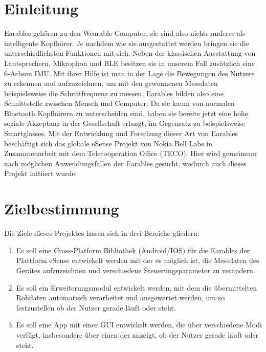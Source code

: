 \documentclass[a4paper,12pt]{article}
\title{\projektName}
\date{\today}
\begin{document}
 \setcounter{page}{2}
 \tableofcontents          %
 \clearpage

\section{Einleitung}
\Gls{Earables} gehören zu den \Gls{Wearable Computer}, sie sind also nichts anderes als intelligente Kopfhörer. Je nachdem wie sie ausgestattet werden bringen sie die unterschiedlichsten Funktionen mit sich. Neben der klassischen Ausstattung von Lautsprechern, Mikrophon und \gls{BLE} besitzen sie in unserem Fall zusätzlich eine \Gls{6-Achsen IMU}. Mit ihrer Hilfe ist man in der Lage die Bewegungen des Nutzers zu erkennen und aufzuzeichnen, um mit den gewonnenen Messdaten  beispielsweise die Schrittfrequenz zu messen.  \Gls{Earables} bilden also eine Schnittstelle zwischen Mensch und Computer. Da sie kaum von normalen Bluetooth Kopfhörern zu unterscheiden sind, haben sie bereits jetzt eine hohe soziale Akzeptanz in der Gesellschaft erlangt, im Gegensatz zu beispielsweise Smartglasses. Mit der Entwicklung und Forschung dieser Art von \Gls{Earables} beschäftigt sich das globale eSense Projekt von Nokia Bell Labs in Zusammenarbeit mit dem Telecooperation Office (TECO). Hier wird gemeinsam nach möglichen Anwendungsfällen der \Gls{Earables} gesucht, wodurch auch dieses Projekt initiiert wurde.
\section{Zielbestimmung}
Die Ziele dieses Projektes lassen sich in drei Bereiche gliedern:
\begin{enumerate}

  \item Es soll eine \Gls{Cross-Platform Bibliothek} (Android/IOS) für die \Gls{Earables} der Plattform eSense entwickelt werden mit der es möglich ist, die Messdaten des Gerätes aufzuzeichnen und verschiedene \Gls{Steuerungsparameter} zu verändern.
  
  \item Es soll ein Erweiterungsmodul entwickelt werden, mit dem die übermittelten  \Gls{Rohdaten} automatisch verarbeitet und ausgewertet werden, um so festzustellen ob der Nutzer gerade läuft oder steht.
  
  \item Es soll eine App mit einer \Gls{GUI} entwickelt werden, die über verschiedene Modi verfügt, insbesondere über einen der anzeigt, ob der Nutzer gerade läuft oder steht. 

\end{enumerate}
\end{document}
